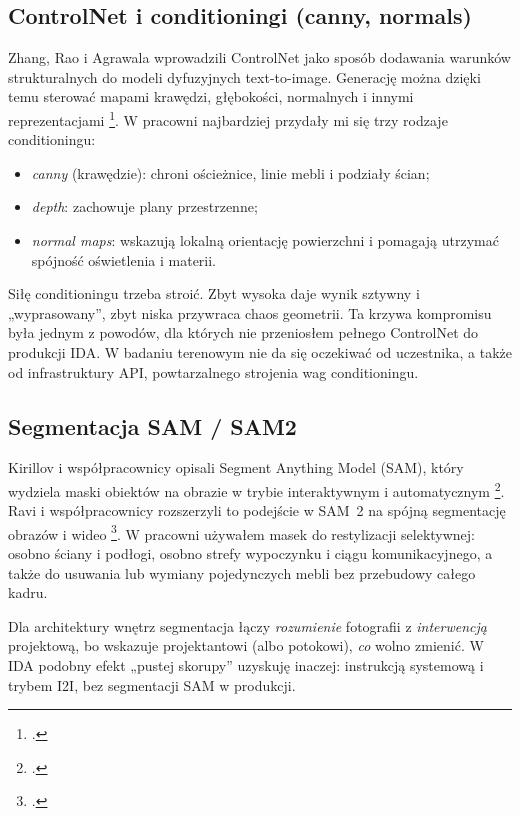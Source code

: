 \subsection{ControlNet i conditioningi (canny, normals)}
\label{ch04:sec:controlnet}

Zhang, Rao i Agrawala wprowadzili ControlNet jako sposób dodawania warunków strukturalnych do modeli dyfuzyjnych text-to-image. Generację można dzięki temu sterować mapami krawędzi, głębokości, normalnych i innymi reprezentacjami \footcite{zhang2023controlnet}.
W pracowni najbardziej przydały mi się trzy rodzaje conditioningu:
\begin{itemize}
  \item \emph{canny} (krawędzie): chroni ościeżnice, linie mebli i podziały ścian;
  \item \emph{depth}: zachowuje plany przestrzenne;
  \item \emph{normal maps}: wskazują lokalną orientację powierzchni i pomagają utrzymać spójność oświetlenia i materii.
\end{itemize}
Siłę conditioningu trzeba stroić. Zbyt wysoka daje wynik sztywny i „wyprasowany”, zbyt niska przywraca chaos geometrii.
Ta krzywa kompromisu była jednym z powodów, dla których nie przeniosłem pełnego ControlNet do produkcji IDA. W badaniu terenowym nie da się oczekiwać od uczestnika, a także od infrastruktury API, powtarzalnego strojenia wag conditioningu.

\subsection{Segmentacja SAM / SAM2}
\label{ch04:sec:sam}

Kirillov i współpracownicy opisali Segment Anything Model (SAM), który wydziela maski obiektów na obrazie w trybie interaktywnym i automatycznym \footcite{kirillov2023sam}. Ravi i współpracownicy rozszerzyli to podejście w SAM~2 na spójną segmentację obrazów i wideo \footcite{ravi2024sam2}.
W pracowni używałem masek do restylizacji selektywnej: osobno ściany i podłogi, osobno strefy wypoczynku i ciągu komunikacyjnego, a także do usuwania lub wymiany pojedynczych mebli bez przebudowy całego kadru.

Dla architektury wnętrz segmentacja łączy \emph{rozumienie} fotografii z \emph{interwencją} projektową, bo wskazuje projektantowi (albo potokowi), \emph{co} wolno zmienić.
W IDA podobny efekt „pustej skorupy” uzyskuję inaczej: instrukcją systemową i trybem I2I, bez segmentacji SAM w produkcji.

